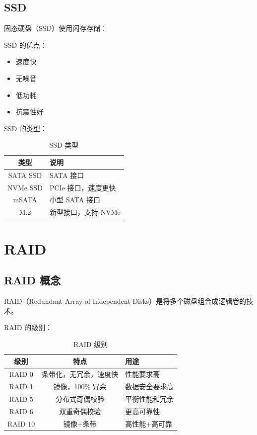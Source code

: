 \documentclass[12pt,UTF8]{ctexbook}
\begin{document}
\section{SSD}
\label{sec:ssd}

固态硬盘（SSD）使用闪存存储：

SSD 的优点：
\begin{itemize}
    \item 速度快
    \item 无噪音
    \item 低功耗
    \item 抗震性好
\end{itemize}

SSD 的类型：
\begin{table}[htbp]
    \centering
    \caption{SSD 类型}
    \begin{tabular}{|c|p{8cm}|}
        \hline
        \textbf{类型} & \textbf{说明} \\
        \hline
        SATA SSD & SATA 接口 \\
        \hline
        NVMe SSD & PCIe 接口，速度更快 \\
        \hline
        mSATA & 小型 SATA 接口 \\
        \hline
        M.2 & 新型接口，支持 NVMe \\
        \hline
    \end{tabular}
\end{table}

\chapter{RAID}
\label{chap:raid}

\section{RAID 概念}
\label{sec:raid_concept}

RAID（Redundant Array of Independent Disks）是将多个磁盘组合成逻辑卷的技术。

RAID 的级别：
\begin{table}[htbp]
    \centering
    \caption{RAID 级别}
    \begin{tabular}{|c|c|p{4cm}|}
        \hline
        \textbf{级别} & \textbf{特点} & \textbf{用途} \\
        \hline
        RAID 0 & 条带化，无冗余，速度快 & 性能要求高 \\
        \hline
        RAID 1 & 镜像，100\% 冗余 & 数据安全要求高 \\
        \hline
        RAID 5 & 分布式奇偶校验 & 平衡性能和冗余 \\
        \hline
        RAID 6 & 双重奇偶校验 & 更高可靠性 \\
        \hline
        RAID 10 & 镜像+条带 & 高性能+高可靠 \\
        \hline
    \end{tabular}
\end{table}
\end{document}
